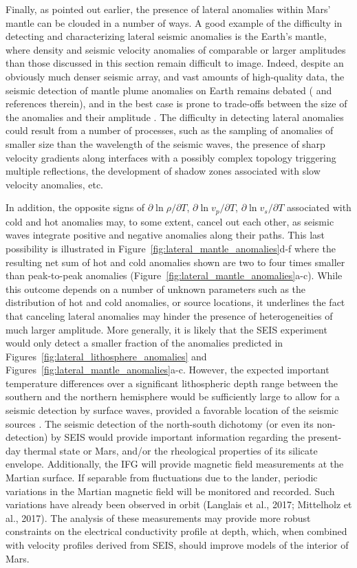 Finally, as pointed out earlier, the presence of lateral anomalies within Mars' mantle can be clouded in a number of ways. 
A good example of the difficulty in detecting and characterizing lateral seismic anomalies is the Earth's mantle, where density and seismic velocity anomalies of comparable or larger amplitudes than those discussed in this section remain difficult to image. Indeed, despite an obviously much denser seismic array, and vast amounts of high-quality data, the seismic detection of mantle plume anomalies on Earth remains debated (\citep{Montelli2004,VanderHilst2006} and references therein), and in the best case is prone to trade-offs between the size of the anomalies and their amplitude \citep{French2014}. 
The difficulty in detecting lateral anomalies could result from a number of processes, such as the sampling of anomalies of smaller size than the wavelength of the seismic waves, the presence of sharp velocity gradients along interfaces with a possibly complex topology triggering multiple reflections, the development of shadow  zones associated with slow velocity anomalies, etc.

In addition, the opposite signs of $\partial \ln\rho / \partial T$, $\partial \ln v_p / \partial T$, $\partial \ln v_s/ \partial T$ associated with cold and hot anomalies may, to some extent, cancel out each other, as seismic waves integrate positive and negative anomalies along their paths. This last possibility is illustrated in Figure~\ref{fig:lateral_mantle_anomalies}d-f where the resulting net sum of hot and cold anomalies shown are two to four times smaller than peak-to-peak anomalies (Figure~\ref{fig:lateral_mantle_anomalies}a-c). While this outcome depends on a number of unknown parameters such as the distribution of hot and cold anomalies, or source locations, it underlines the fact that canceling lateral anomalies may hinder the presence of heterogeneities of much larger amplitude.
More generally, it is likely that the SEIS experiment would only detect a smaller fraction of the anomalies predicted in Figures~\ref{fig:lateral_lithosphere_anomalies} and Figures~\ref{fig:lateral_mantle_anomalies}a-c.
However, the expected important temperature differences over a significant lithospheric depth range between the southern and the northern hemisphere would be sufficiently large to allow for a seismic detection by surface waves, provided a favorable location of the seismic sources \citep{Panning2016}.
The seismic detection of the north-south dichotomy (or even its non-detection) by SEIS would provide important information regarding the present-day thermal state or Mars, and/or the rheological properties of its silicate envelope. Additionally, the IFG will provide magnetic field measurements at the Martian surface. If separable from fluctuations due to the lander, periodic variations in the Martian magnetic field will be monitored and recorded. Such variations have already been observed in orbit (Langlais et al., 2017; Mittelholz et al., 2017). The analysis of these measurements may provide more robust constraints on the electrical conductivity profile at depth, which, when combined with velocity profiles derived from SEIS, should improve models of the interior of Mars.


